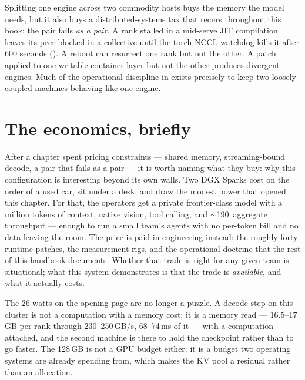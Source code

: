 Splitting one engine across two commodity hosts buys the memory the model
needs, but it also buys a distributed-systems tax that recurs throughout
this book: the pair fails \emph{as a pair}. A rank stalled in a mid-serve
JIT compilation leaves its peer blocked in a collective until the torch NCCL
watchdog kills it after 600 seconds (). A reboot can resurrect
one rank but not the other. A patch applied to one writable container layer
but not the other produces divergent engines. Much of the operational
discipline in  exists precisely to keep two
loosely coupled machines behaving like one engine.

\section{The economics, briefly}
\label{sec:problem:econ}

After a chapter spent pricing constraints --- shared memory,
streaming-bound decode, a pair that fails as a pair --- it is worth naming
what they buy: why this configuration is interesting beyond its own
walls. Two DGX Sparks cost on the order of a used car, sit under a desk, and
draw the modest power that opened this chapter. For that, the operators get a private frontier-class model with a million
tokens of context, native vision, tool calling, and $\sim$190\,\tokspersec{}
aggregate throughput --- enough to run a small team's agents with no per-token
bill and no data leaving the room. The price is paid in engineering instead:
the roughly forty runtime patches, the measurement rigs, and the operational
doctrine that the rest of this handbook documents. Whether that trade is
right for any given team is situational; what this system demonstrates is
that the trade is \emph{available}, and what it actually costs.

\FloatBarrier
The 26 watts on the opening page are no longer a puzzle. A decode step on
this cluster is not a computation with a memory cost; it is a memory read
--- 16.5--17\,GB per rank through 230--250\,GB/s, 68--74\,ms of it ---
with a computation attached, and the second machine is there to hold the
checkpoint rather than to go faster. The 128\,GB is not a GPU budget either:
it is a budget two operating systems are already spending from, which makes
the KV pool a residual rather than an allocation.

